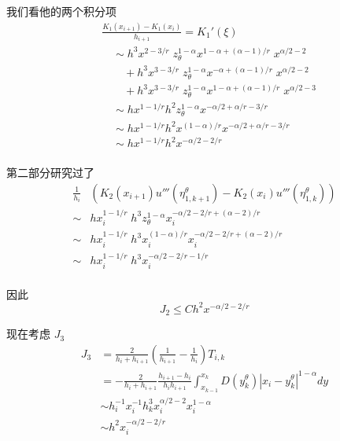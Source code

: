 \documentclass{ctexart}
\begin{document}
我们看他的两个积分项
\begin{equation}
    \begin{aligned}
    &\frac{K_1(x_{i+1}) - K_1(x_{i})}{h_{i+1}} = K_1'(\xi)    \\
    & \quad \sim h^3 x^{2-3/r} \; z_\theta^{1-\alpha} x^{1-\alpha+(\alpha-1)/r} \; x^{\alpha/2-2} \\
        &\qquad + h^3 x^{3-3/r} \; z_\theta^{1-\alpha} x^{-\alpha+(\alpha-1)/r} \; x^{\alpha/2-2} \\
        &\qquad + h^3 x^{3-3/r} \; z_\theta^{1-\alpha} x^{1-\alpha+(\alpha-1)/r} \; x^{\alpha/2-3} \\
    & \quad \sim hx^{1-1/r} h^2 z_\theta^{1-\alpha} x^{-\alpha/2+\alpha/r-3/r}  \\
    & \quad \sim hx^{1-1/r} h^2 x^{(1-\alpha)/r} x^{-\alpha/2+\alpha/r-3/r} \\
    & \quad \sim hx^{1-1/r} h^2 x^{-\alpha/2-2/r} \\
    \end{aligned}
\end{equation}

第二部分研究过了
\begin{equation}
    \begin{aligned}
        \frac{1}{h_i} & (K_2(x_{i+1}) u'''(\eta_{1,k+1}^\theta) - K_2(x_{i}) u'''(\eta_{1,k}^\theta))    \\
        \sim & hx_i^{1-1/r} \; h^3 z_\theta^{1-\alpha} x_i^{-\alpha/2-2/r+(\alpha-2)/r} \\
        \sim & hx_i^{1-1/r} \; h^3 x_i^{(1-\alpha)/r} x_i^{-\alpha/2-2/r+(\alpha-2)/r}    \\
        \sim & hx_i^{1-1/r} \; h^3 x_i^{-\alpha/2-2/r-1/r}    \\
    \end{aligned}
\end{equation}

因此
\begin{equation}
    J_2 \le C h^2 x^{-\alpha/2-2/r}
\end{equation}

现在考虑 \(J_3\)
\begin{equation}
    \begin{aligned}
        J_3 & = \frac{2}{h_i + h_{i+1}}(\frac{1}{h_{i+1}} - \frac{1}{h_{i}}) T_{i,k}   \\
        &= -\frac{2}{h_i + h_{i+1}}\frac{h_{i+1} -h_{i}}{h_{i}h_{i+1}} \int_{x_{k-1}}^{x_k} D(y_k^\theta) |x_i - y_k^\theta|^{1-\alpha} dy\\
        &\sim h_i^{-1}x_i^{-1} h_k^3 x_i^{\alpha/2-2} x_i^{1-\alpha} \\
        &\sim h^2 x_i^{-\alpha/2-2/r}
    \end{aligned}
\end{equation}
\end{document}

